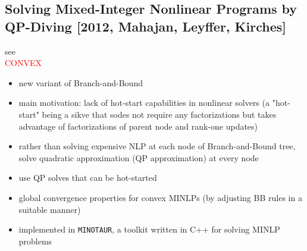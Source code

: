 \documentclass{article}
\begin{document}
\subsection{Solving Mixed-Integer Nonlinear Programs by QP-Diving [2012, Mahajan, Leyffer, Kirches]}
see \cite{mahajan2012solving}\\
\textcolor{red}{CONVEX}
\begin{itemize}
\item new variant of Branch-and-Bound
\item main motivation: lack of hot-start capabilities in nonlinear solvers (a "hot-start" being a sikve that sodes not require any factorizations but takes advantage of factorizations of parent node and rank-one updates)
\item rather than solving expensive NLP at each node of Branch-and-Bound tree, solve quadratic approximation (QP approximation) at every node
\item use QP solves that can be hot-started
\item global convergence properties for convex MINLPs (by adjusting BB rules in a suitable manner)
\item implemented in \texttt{MINOTAUR}, a toolkit written in C++ for solving MINLP problems
\end{itemize}
\end{document}
